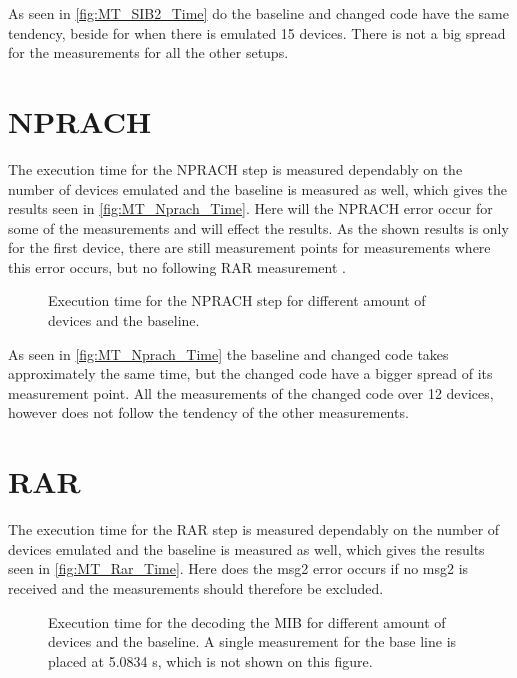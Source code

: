 
As seen in \autoref{fig:MT_SIB2_Time} do the baseline and changed code have the same tendency, beside for when there is emulated 15 devices. There is not a big spread for the measurements for all the other setups. 

\section{NPRACH}
The execution time for the NPRACH step is measured dependably on the number of devices emulated and the baseline is measured as well, which gives the results seen in \autoref{fig:MT_Nprach_Time}. Here will the NPRACH error occur for some of the measurements and will effect the results. As the shown results is only for the first device, there are still measurement points for measurements where this error occurs, but no following RAR measurement .

\begin{figure}[H]
\centering
\resizebox{0.5\textwidth}{!}{
}
\caption{Execution time for the NPRACH step for different amount of devices and the baseline.}
\label{fig:MT_Nprach_Time}
\end{figure}

As seen in \autoref{fig:MT_Nprach_Time} the baseline and changed code takes approximately the same time, but the changed code have a bigger spread of its measurement point. All the measurements of the changed code over 12 devices, however does not follow the tendency of the other measurements. 

\section{RAR}
The execution time for the RAR step is measured dependably on the number of devices emulated and the baseline is measured as well, which gives the results seen in \autoref{fig:MT_Rar_Time}. Here does the msg2 error occurs if no msg2 is received and the measurements should therefore be excluded. 

\begin{figure}[H]
\centering
\resizebox{0.5\textwidth}{!}{
}
\caption{Execution time for the decoding the MIB for different amount of devices and the baseline. A single measurement for the base line is placed at 5.0834 s, which is not shown on this figure.}
\label{fig:MT_Rar_Time}
\end{figure}

